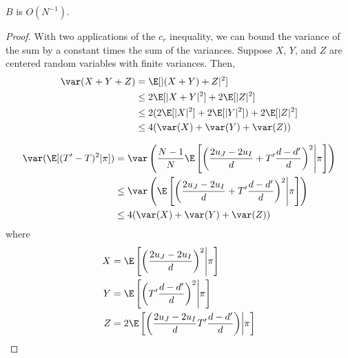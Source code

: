 \begin{proposition}
  $B$ is $O(N^{-1})$.
\end{proposition}
\begin{proof}
  With two applications of the $c_r$ inequality, we can bound the
  variance of the sum by a constant times the sum of the variances.  
  Suppose $X$, $Y$, and $Z$ are centered random variables with finite
  variances.  Then, 
  \begin{align*}
    \var(X+Y+Z) &= \E[|(X+Y)+Z|^2] \\
    &\leq 2 \E[|X+Y|^2] + 2\E[|Z|^2] \\
    &\leq 2(2\E[|X|^2] + 2\E[|Y|^2]) + 2\E[|Z|^2] \\
    &\leq 4(\var(X) + \var(Y) + \var(Z))
  \end{align*}

  \begin{align*}
    \var (\E[(T'-T)^2 | \pi]) &= \var \left ( \frac{N-1}{N}\E \left [
      \left ( \frac{2u_J-2u_I}{d}+T'\frac{d-d'}{d} \right )^2
        \middle | \pi \right ] \right ) \\
    &\leq \var \left ( \E \left [
      \left ( \frac{2u_J-2u_I}{d}+T'\frac{d-d'}{d} \right )^2
        \middle | \pi \right ] \right ) \\
    &\leq 4(\var(X) + \var(Y) + \var(Z))
  \end{align*}
  where
  \begin{align*}
    X &= \E \left [ \left ( \frac{2u_J-2u_I}{d} \right )^2
        \middle | \pi \right ] \\
    Y &= \E \left [ \left
          ( T'\frac{d-d'}{d} \right )^2 \middle | \pi \right ] \\
    Z &= 2 \E \left [ \left ( \frac{2u_J-2u_I}{d}
         T'\frac{d-d'}{d} \right ) \middle | \pi \right ]
  \end{align*}


\end{proof}
